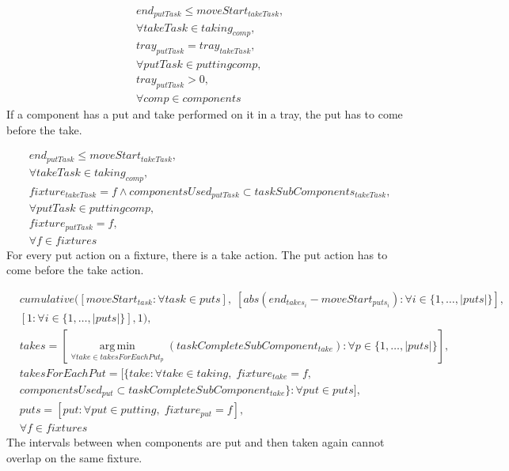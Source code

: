 \documentclass[10pt,a4paper]{report}
\begin{document}
\begin{equation}
\begin{aligned}\label{eq:98}
&end_{putTask} \le moveStart_{takeTask}, \\
&\forall takeTask \in taking_{comp}, \\
&tray_{putTask} = tray_{takeTask}, \\
&\forall putTask \in putting{comp}, \\
&tray_{putTask} > 0, \\
&\forall comp \in components
\end{aligned}
\end{equation}
If a component has a put and take performed on it in a tray, the put has to come before the take.


\begin{equation}
\begin{aligned}\label{eq:99}
&end_{putTask} \le moveStart_{takeTask}, \\
&\forall takeTask \in taking_{comp}, \\
&fixture_{takeTask} = f \land componentsUsed_{putTask} \subset taskSubComponents_{takeTask}, \\
&\forall putTask \in putting{comp}, \\
&fixture_{putTask} = f, \\
&\forall f \in fixtures
\end{aligned}
\end{equation}
For every put action on a fixture, there is a take action. The put action has to come before the take action.

\begin{equation}
\begin{aligned}\label{eq:100}
&cumulative([moveStart_{task} : \forall task \in puts],\; [abs(end_{takes_i}-moveStart_{puts_i}) : \forall i \in \{1 , \ldots , |puts|\}], \\
&[1 : \forall i \in \{1 , \ldots , |puts|\}], 1), \\
&takes = [\operatorname*{arg\,min}_{\forall take \in takesForEachPut_p}(taskCompleteSubComponent_{take}) : \forall p \in \{1 , \ldots , |puts|\}], \\
&takesForEachPut = [\{take : \forall take \in taking, \; fixture_{take} = f, \\
&componentsUsed_{put} \subset taskCompleteSubComponent_{take}\} : \forall put \in puts], \\
&puts = [put : \forall put \in putting, \; fixture_{put} = f], \\
&\forall f \in fixtures
\end{aligned}
\end{equation}
The intervals between when components are put and then taken again cannot overlap on the same fixture.
\end{document}
